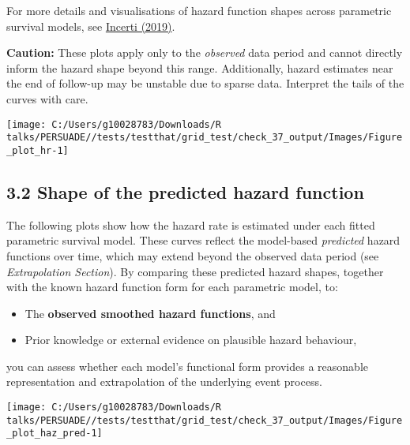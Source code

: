 \documentclass[
]{article}
\providecommand{\tightlist}{%
  \setlength{\itemsep}{0pt}\setlength{\parskip}{0pt}}
\begin{document}
For more details and visualisations of hazard function shapes across
parametric survival models, see
\href{https://devinincerti.com/2019/06/18/parametric_survival.html}{Incerti
(2019)}.

\textbf{Caution:} These plots apply only to the \emph{observed} data
period and cannot directly inform the hazard shape beyond this range.
Additionally, hazard estimates near the end of follow-up may be unstable
due to sparse data. Interpret the tails of the curves with care.

\clearpage

\begin{flushleft}\texttt{[image: C:/Users/g10028783/Downloads/R talks/PERSUADE//tests/testthat/grid\_test/check\_37\_output/Images/Figure\_plot\_hr-1]} \end{flushleft}

\clearpage

\subsection{3.2 Shape of the predicted hazard
function}\label{shape-of-the-predicted-hazard-function}

The following plots show how the hazard rate is estimated under each
fitted parametric survival model. These curves reflect the model-based
\emph{predicted} hazard functions over time, which may extend beyond the
observed data period (see \emph{Extrapolation Section}). By comparing
these predicted hazard shapes, together with the known hazard function
form for each parametric model, to:

\begin{itemize}
\tightlist
\item
  The \textbf{observed smoothed hazard functions}, and\\
\item
  Prior knowledge or external evidence on plausible hazard behaviour,
\end{itemize}

you can assess whether each model's functional form provides a
reasonable representation and extrapolation of the underlying event
process.

\clearpage

\begin{flushleft}\texttt{[image: C:/Users/g10028783/Downloads/R talks/PERSUADE//tests/testthat/grid\_test/check\_37\_output/Images/Figure\_plot\_haz\_pred-1]} \end{flushleft}
\end{document}
